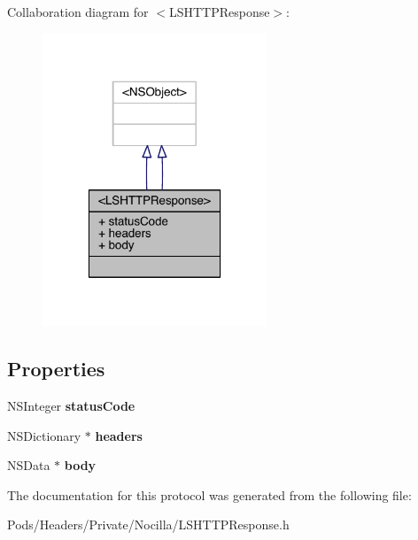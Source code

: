 Collaboration diagram for $<$L\-S\-H\-T\-T\-P\-Response$>$\-:\nopagebreak
\begin{figure}[H]
\begin{center}
\leavevmode
\includegraphics[width=190pt]{protocol_l_s_h_t_t_p_response-p__coll__graph}
\end{center}
\end{figure}
\subsection*{Properties}
\begin{DoxyCompactItemize}
\item 
\hypertarget{protocol_l_s_h_t_t_p_response-p_a497ebf49779a6b4ea2e8ef23ea9fb166}{N\-S\-Integer {\bfseries status\-Code}}\label{protocol_l_s_h_t_t_p_response-p_a497ebf49779a6b4ea2e8ef23ea9fb166}

\item 
\hypertarget{protocol_l_s_h_t_t_p_response-p_a8fafdf92fb09f4f6e20fe7f0cf209c5c}{N\-S\-Dictionary $\ast$ {\bfseries headers}}\label{protocol_l_s_h_t_t_p_response-p_a8fafdf92fb09f4f6e20fe7f0cf209c5c}

\item 
\hypertarget{protocol_l_s_h_t_t_p_response-p_a5bdd7a021141aa83e04b91a09de08f06}{N\-S\-Data $\ast$ {\bfseries body}}\label{protocol_l_s_h_t_t_p_response-p_a5bdd7a021141aa83e04b91a09de08f06}

\end{DoxyCompactItemize}


The documentation for this protocol was generated from the following file\-:\begin{DoxyCompactItemize}
\item 
Pods/\-Headers/\-Private/\-Nocilla/L\-S\-H\-T\-T\-P\-Response.\-h\end{DoxyCompactItemize}
